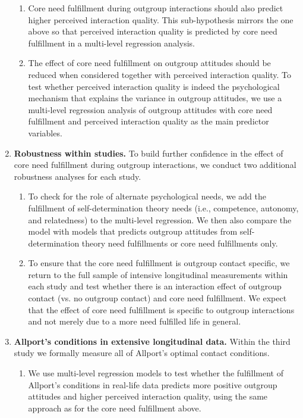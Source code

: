 \documentclass[man, 12pt, a4paper, mask]{apa7}
\theoremstyle{break}
\theoremstyle{plain}
\begin{document}
\begin{enumerate}
\begin{enumerate}
        \item Core need fulfillment during outgroup interactions should also predict higher perceived interaction quality. This sub-hypothesis mirrors the one above so that perceived interaction quality is predicted by core need fulfillment in a multi-level regression analysis.
        \item The effect of core need fulfillment on outgroup attitudes should be reduced when considered together with perceived interaction quality. To test whether perceived interaction quality is indeed the psychological mechanism that explains the variance in outgroup attitudes, we use a multi-level regression analysis of outgroup attitudes with core need fulfillment and perceived interaction quality as the main predictor variables.
    \end{enumerate}
    \item \textbf{Robustness within studies.} To build further confidence in the effect of core need fulfillment during outgroup interactions, we conduct two additional robustness analyses for each study. 
    \begin{enumerate}
        \item To check for the role of alternate psychological needs, we add the fulfillment of self-determination theory needs (i.e., competence, autonomy, and relatedness) to the multi-level regression. We then also compare the model with models that predicts outgroup attitudes from self-determination theory need fulfillments or core need fulfillments only. 
        \item To ensure that the core need fulfillment is outgroup contact specific, we return to the full sample of intensive longitudinal measurements within each study and test whether there is an interaction effect of outgroup contact (vs. no outgroup contact) and core need fulfillment. We expect that the effect of core need fulfillment is specific to outgroup interactions and not merely due to a more need fulfilled life in general.
    \end{enumerate} 
    \item \textbf{Allport's conditions in extensive longitudinal data.} Within the third study we formally measure all of Allport's optimal contact conditions. 
    \begin{enumerate}
        \item We use multi-level regression models to test whether the fulfillment of Allport's conditions in real-life data predicts more positive outgroup attitudes and higher perceived interaction quality, using the same approach as for the core need fulfillment above.

\end{enumerate}
\end{enumerate}
\end{document}

